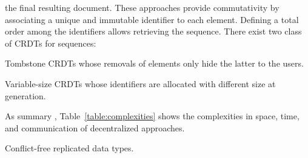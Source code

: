 \begin{asparadesc}
  the final resulting document. These approaches provide commutativity by
  associating a unique and immutable identifier to each element. Defining a
  total order among the identifiers allows retrieving the sequence. There exist
  two class of CRDTs for sequences:
  \begin{inparaenum}[(i)]
  \item [Tombstone CRDTs] whose removals of elements only hide the latter to the
    users. 
  \item [Variable-size CRDTs] whose identifiers are allocated with different
    size at generation.
  \end{inparaenum}
\item [As summary], Table~\ref{table:complexities} shows the complexities in
  space, time, and communication of decentralized approaches. 
\end{asparadesc}

\begin{algorithm}
  
  \caption{\label{algo:crdtabsract}Conflict-free replicated data types.}
\end{algorithm}

